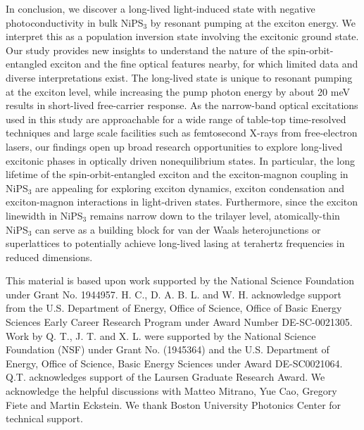 \documentclass[%
 reprint,
superscriptaddress,
 amsmath,amssymb,
 aps,
]{revtex4-2}
\begin{document}
In conclusion, we discover a long-lived light-induced state with negative photoconductivity in bulk NiPS$_3$ by resonant pumping at the exciton energy. We interpret this as a population inversion state involving the excitonic ground state. Our study provides new insights to understand the nature of the spin-orbit-entangled exciton and the fine optical features nearby, for which limited data and diverse interpretations exist\cite{Kang2020,Wang2021,Klaproth2023,Jana,Kim2023,He2024,Hamad2024}. The long-lived state is unique to resonant pumping at the exciton level, while increasing the pump photon energy by about 20 meV results in short-lived free-carrier response. As the narrow-band optical excitations used in this study are approachable for a wide range of table-top time-resolved techniques and large scale facilities such as femtosecond X-rays from free-electron lasers, our findings open up broad research opportunities to explore long-lived excitonic phases in optically driven nonequilibrium states. In particular, the long lifetime of the spin-orbit-entangled exciton and the exciton-magnon coupling in NiPS$_3$ are appealing for exploring exciton dynamics, exciton condensation and exciton-magnon interactions in light-driven states. Furthermore, since the exciton linewidth in NiPS$_3$ remains narrow down to the trilayer level\cite{Wang2021}, atomically-thin NiPS$_3$ can serve as a building block for van der Waals heterojunctions or superlattices to potentially achieve long-lived lasing at terahertz frequencies in reduced dimensions.           


This material is based upon work supported by the National Science Foundation under Grant No. 1944957. H. C., D. A. B. L. and W. H. acknowledge support from the U.S. Department of Energy, Office of Science, Office of Basic Energy Sciences Early Career Research Program under Award Number DE-SC-0021305. Work by Q. T., J. T. and X. L. were supported by the National Science Foundation (NSF) under Grant No. (1945364) and the U.S. Department of Energy, Office of Science, Basic Energy Sciences under Award DE-SC0021064. Q.T. acknowledges support of the Laursen Graduate Research Award. We acknowledge the helpful discussions with Matteo Mitrano, Yue Cao, Gregory Fiete and Martin Eckstein. We thank Boston University Photonics Center for technical support. 
\end{document}
